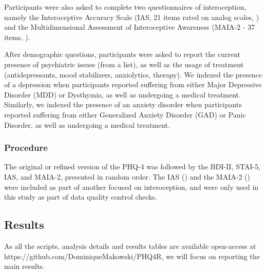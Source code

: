 \documentclass[
  jou,
  longtable,
  nolmodern,
  notxfonts,
  notimes,
  mask,
  colorlinks=true,linkcolor=blue,citecolor=blue,urlcolor=blue]{apa7}
\begin{document}
Participants were also asked to complete two questionnaires of
interoception, namely the Interoceptive Accuracy Scale (IAS, 21 items
rated on analog scales, ) and the Multidimensional Assessment of Interoceptive Awareness
(MAIA-2 - 37 items, ).

After demographic questions, participants were asked to report the
current presence of psychiatric issues (from a list), as well as the
usage of treatment (antidepressants, mood stabilizers, anxiolytics,
therapy). We indexed the presence of a depression when participants
reported suffering from either Major Depressive Disorder (MDD) or
Dysthymia, as well as undergoing a medical treatment. Similarly, we
indexed the presence of an anxiety disorder when participants reported
suffering from either Generalized Anxiety Disorder (GAD) or Panic
Disorder, as well as undergoing a medical treatment.

\subsubsection{Procedure}\label{procedure-1}

The original or refined version of the PHQ-4 was followed by the BDI-II,
STAI-5, IAS, and MAIA-2, presented in random order. The IAS
() and the MAIA-2
() were
included as part of another focused on interoception, and were only used
in this study as part of data quality control checks.

\subsection{Results}\label{results-1}

As all the scripts, analysis details and results tables are available
open-access at https://github.com/DominiqueMakowski/PHQ4R, we will focus
on reporting the main results.
\end{document}
